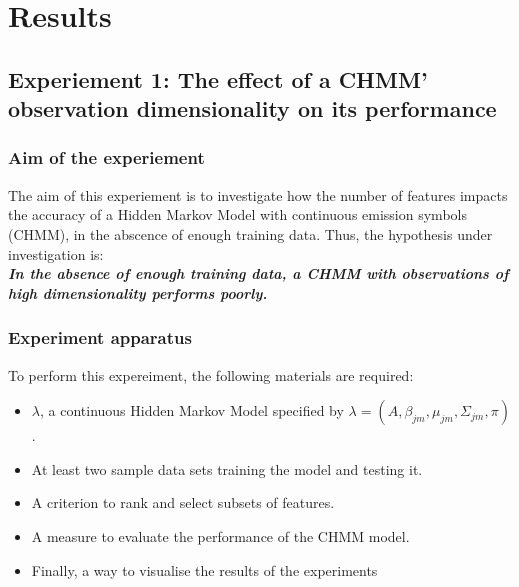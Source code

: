 \chapter{Results}

\section{Experiement 1: The effect of a CHMM' observation dimensionality on its performance}

\subsection{Aim of the experiement}
The aim of this experiement is to investigate how the number of features impacts the accuracy of a Hidden Markov Model with continuous emission symbols (CHMM), in the abscence of enough training data. Thus, the hypothesis under investigation is:\\
\textbf{\textit{In the absence of enough training data, a CHMM with observations of high dimensionality performs poorly.}}

\subsection{Experiment apparatus}
To perform this expereiment, the following materials are required:
\begin{itemize}
	\item \(\lambda\), a continuous Hidden Markov Model specified by \(\lambda = (A, \beta_{jm}, \mu_{jm}, \Sigma_{jm}, \pi)\).
	\item At least two sample data sets training the model and testing it.
	\item A criterion to rank and select subsets of features.
	\item A measure to evaluate the performance of the CHMM model.
	\item Finally, a way to visualise the results of the experiments
\end{itemize}

